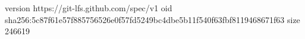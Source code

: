 version https://git-lfs.github.com/spec/v1
oid sha256:5c87f61e57f885756526e0f57fd5249bc4dbe5b11f540f63fbf8119468671f63
size 246619

